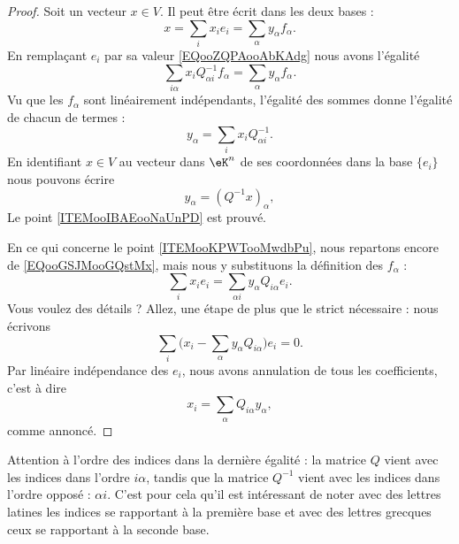 \begin{proof}
    Soit un vecteur \( x\in V\). Il peut être écrit dans les deux bases :
    \begin{equation}        \label{EQooGSJMooGQstMx}
        x=\sum_ix_ie_i=\sum_{\alpha}y_{\alpha}f_{\alpha}.
    \end{equation}
    En remplaçant \( e_i\) par sa valeur \eqref{EQooZQPAooAbKAdg} nous avons l'égalité
    \begin{equation}
        \sum_{i\alpha}x_iQ^{-1}_{\alpha i}f_{\alpha}=\sum_{\alpha}y_{\alpha}f_{\alpha}.
    \end{equation}
    Vu que les \( f_{\alpha}\) sont linéairement indépendants, l'égalité des sommes donne l'égalité de chacun de termes :
    \begin{equation}
        y_{\alpha}=\sum_ix_iQ^{-1}_{\alpha i}.
    \end{equation}
    En identifiant \( x\in V\) au vecteur dans \( \eK^n\) de ses coordonnées dans la base \( \{ e_i \}\) nous pouvons écrire
    \begin{equation}
        y_{\alpha}=(Q^{-1}x)_{\alpha},
    \end{equation}
    Le point \ref{ITEMooIBAEooNaUnPD} est prouvé.

    En ce qui concerne le point \ref{ITEMooKPWTooMwdbPu}, nous repartons encore de \eqref{EQooGSJMooGQstMx}, mais nous y substituons la définition des \( f_{\alpha}\) :
    \begin{equation}
        \sum_{i}x_ie_i=\sum_{\alpha i}y_{\alpha}Q_{i\alpha}e_i.
    \end{equation}
    Vous voulez des détails ? Allez, une étape de plus que le strict nécessaire : nous écrivons
    \begin{equation}
        \sum_i\big( x_i-\sum_{\alpha}y_{\alpha}Q_{i\alpha} \big)e_i=0.
    \end{equation}
    Par linéaire indépendance des \( e_i\), nous avons annulation de tous les coefficients, c'est à dire
    \begin{equation}
        x_i=\sum_{\alpha}Q_{i\alpha}y_{\alpha},
    \end{equation}
    comme annoncé.
\end{proof}

\begin{normaltext}
    Attention à l'ordre des indices dans la dernière égalité : la matrice \( Q\) vient avec les indices dans l'ordre \( i\alpha\), tandis que la matrice \( Q^{-1}\) vient avec les indices dans l'ordre opposé : \( \alpha i\). C'est pour cela qu'il est intéressant de noter avec des lettres latines les indices se rapportant à la première base et avec des lettres grecques ceux se rapportant à la seconde base.
\end{normaltext}

